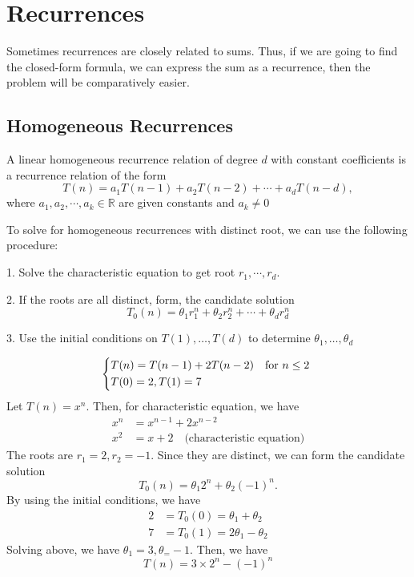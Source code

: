 \chapter{Recurrences}

Sometimes recurrences are closely related to sums. Thus, if we are going to find the closed-form formula, we can express the sum as a recurrence, then the problem will be comparatively easier.

\section{Homogeneous Recurrences}
\begin{definition}
    A linear homogeneous recurrence relation of degree \(d\) with constant coefficients is a recurrence relation of the form
    \[
        T(n) = a_1 T(n-1) + a_2 T(n-2) + \cdots + a_d T(n-d) ,
    \]
    where \(a_1, a_2, \cdots, a_k \in \mathbb{R}\) are given constants and \(a_k \neq  0\) 
\end{definition}

To solve for homogeneous recurrences with distinct root, we can use the following procedure:

1. Solve the characteristic equation to get root \(r_1, \cdots, r_d\).

2. If the roots are all distinct, form, the candidate solution
\[
    T_0(n) = \theta_1 r_1^n + \theta_2 r_2^n + \cdots + \theta_d r_d^n
\]

3. Use the initial conditions on \(T(1), \dots, T(d)\) to determine \(\theta_1, \dots, \theta_d\) 

\begin{eg}
    \[
        \begin{dcases}
            T(n) = T(n - 1) + 2T(n - 2)\quad\text{for \(n \leq  2\) }\\
            T(0) = 2, T(1) = 7
        \end{dcases}
    \]
    Let \(T(n) = x^n\). Then, for characteristic equation, we have
    \[
    \begin{aligned}
        x^n &= x^{n-1} + 2x^{n-2} \\
        x^2 &= x + 2 \quad \text{(characteristic equation)}
    \end{aligned}
    \]
    The roots are \(r_1 = 2, r_2 = -1\). Since they are distinct, we can form the candidate solution
    \[
        T_0(n) = \theta_1 2^n + \theta_2 (-1)^n.
    \]
    By using the initial conditions, we have
    \[
        \begin{aligned}
            2 &= T_0(0) = \theta_1 + \theta_2 \\
            7 &= T_0(1) = 2\theta_1 - \theta_2
        \end{aligned}
    \]
    Solving above, we have \(\theta_1 = 3, \theta_ = -1\). Then, we have
    \[
        T(n) = 3 \times 2^n - (-1)^n
    \] 
\end{eg}

